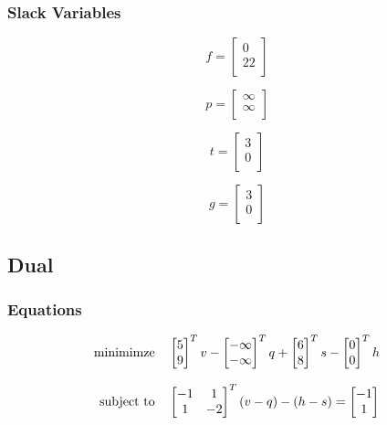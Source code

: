 \documentclass[14pt]{extarticle}
\begin{document}
\subsubsection*{Slack Variables}
\[f = \begin{bmatrix}
    0 \\
    22 \\
\end{bmatrix}\]

\[p = \begin{bmatrix}
    \infty \\
    \infty \\
\end{bmatrix}\]

\[t = \begin{bmatrix}
    3 \\
    0 \\
\end{bmatrix}\]

\[g = \begin{bmatrix}
    3 \\
    0 \\
\end{bmatrix}\]

\subsection*{Dual}
\subsubsection*{Equations}
\[\begin{tabular}{r l}
    minimimze & $\begin{bmatrix}
        5 \\
        9 \\
    \end{bmatrix}^Tv
    - \begin{bmatrix}
        -\infty \\
        -\infty \\
    \end{bmatrix}^Tq
    + \begin{bmatrix}
        6 \\
        8 \\
    \end{bmatrix}^Ts
    - \begin{bmatrix}
        0 \\
        0 \\
    \end{bmatrix}^Th$ \\
    \\
    subject to & $\begin{bmatrix}
        -1 & 1 \\
        1 & -2 \\
    \end{bmatrix}^T(v-q)-(h-s)=\begin{bmatrix}
        -1 \\
        1 \\
    \end{bmatrix}$
\end{tabular}\]
\end{document}
